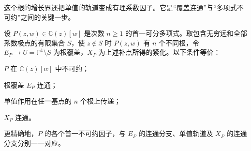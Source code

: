 这个根的增长界还把单值的轨道变成有理系数因子。它是“覆盖连通”与“多项式不可约”之间的关键一步。

\begin{theorem}\label{g4:thm:0204:irreducible-connected}
	设 \(P(z,w)\in\mathbb C(z)[w]\) 是次数 \(n\ge1\) 的首一可分多项式。取包含无穷远和全部系数极点的有限集合 \(S\)，使 \(z\notin S\) 时 \(P(z,w)\) 有 \(n\) 个不同根，令 \(E_P\to U=\mathbb P^1\setminus S\) 为根覆盖，\(X_P\) 为上述补点所得的紧化。以下条件等价：
	\begin{equivalences}
		\item \(P\) 在 \(\mathbb C(z)[w]\) 中不可约；
		\item 根覆盖 \(E_P\) 连通；
		\item 单值作用在任一基点的 \(n\) 个根上传递；
		\item \(X_P\) 连通。
	\end{equivalences}
	更精确地，\(P\) 的各个首一不可约因子，与 \(E_P\) 的连通分支、单值轨道及 \(X_P\) 的连通分支分别一一对应。
\end{theorem}
